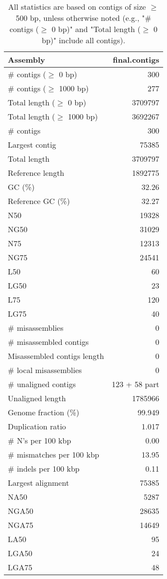 \documentclass[12pt,a4paper]{article}
\begin{document}
\begin{table}[ht]
\begin{center}
\caption{All statistics are based on contigs of size $\geq$ 500 bp, unless otherwise noted (e.g., "\# contigs ($\geq$ 0 bp)" and "Total length ($\geq$ 0 bp)" include all contigs).}
\begin{tabular}{|l*{1}{|r}|}
\hline
Assembly & final.contigs \\ \hline
\# contigs ($\geq$ 0 bp) & 300 \\ \hline
\# contigs ($\geq$ 1000 bp) & 277 \\ \hline
Total length ($\geq$ 0 bp) & 3709797 \\ \hline
Total length ($\geq$ 1000 bp) & 3692267 \\ \hline
\# contigs & 300 \\ \hline
Largest contig & 75385 \\ \hline
Total length & 3709797 \\ \hline
Reference length & 1892775 \\ \hline
GC (\%) & 32.26 \\ \hline
Reference GC (\%) & 32.27 \\ \hline
N50 & 19328 \\ \hline
NG50 & 31029 \\ \hline
N75 & 12313 \\ \hline
NG75 & 24541 \\ \hline
L50 & 60 \\ \hline
LG50 & 23 \\ \hline
L75 & 120 \\ \hline
LG75 & 40 \\ \hline
\# misassemblies & 0 \\ \hline
\# misassembled contigs & 0 \\ \hline
Misassembled contigs length & 0 \\ \hline
\# local misassemblies & 0 \\ \hline
\# unaligned contigs & 123 + 58 part \\ \hline
Unaligned length & 1785966 \\ \hline
Genome fraction (\%) & 99.949 \\ \hline
Duplication ratio & 1.017 \\ \hline
\# N's per 100 kbp & 0.00 \\ \hline
\# mismatches per 100 kbp & 13.95 \\ \hline
\# indels per 100 kbp & 0.11 \\ \hline
Largest alignment & 75385 \\ \hline
NA50 & 5287 \\ \hline
NGA50 & 28635 \\ \hline
NGA75 & 14649 \\ \hline
LA50 & 95 \\ \hline
LGA50 & 24 \\ \hline
LGA75 & 48 \\ \hline
\end{tabular}
\end{center}
\end{table}
\end{document}
